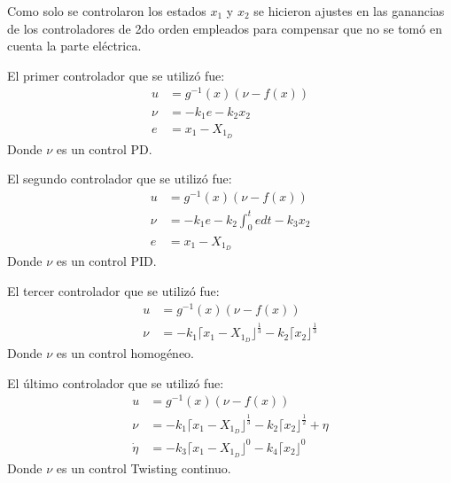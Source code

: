 \documentclass[onecolumn,10pt]{article}
\begin{document}
Como solo se controlaron los estados $x_1$ y $x_2$ se hicieron ajustes en las ganancias de los controladores de 2do orden empleados para compensar que no se tom\'o en cuenta la parte el\'ectrica.

El primer controlador que se utiliz\'o fue:
\begin{equation*}
\begin{split}
 u&=g^{-1}(x)(\nu-f(x))\\
 \nu&=-k_1e-k_2x_2 \\
e&=x_1-X_{1_{D}} 
\end{split}
\end{equation*}
Donde $\nu$ es un control PD.

El segundo controlador que se utiliz\'o fue:
\begin{equation*}
\begin{split}
 u&=g^{-1}(x)(\nu-f(x))\\
 \nu&=-k_1e-k_2\int_{0}^{t}edt-k_3x_2 \\
e&=x_1-X_{1_{D}} 
\end{split}
\end{equation*}
Donde $\nu$ es un control PID.

El tercer controlador que se utiliz\'o fue:
\begin{equation*}
\begin{split}
 u&=g^{-1}(x)(\nu-f(x))\\
 \nu&=-k_1\lceil x_1-X_{1_{D}} \rfloor ^{\frac{1}{3}}-k_2\lceil x_2 \rfloor ^{\frac{1}{3}}
\end{split}
\end{equation*}
Donde $\nu$ es un control homog\'eneo.


El \'ultimo controlador que se utiliz\'o fue:
\begin{equation*}
\begin{split}
 u&=g^{-1}(x)(\nu-f(x))\\
 \nu&=-k_1\lceil x_1-X_{1_{D}} \rfloor ^{\frac{1}{3}}-k_2\lceil x_2 \rfloor ^{\frac{1}{2}}+\eta \\
\dot{\eta}&=-k_3\lceil x_1-X_{1_{D}} \rfloor ^{0}-k_4\lceil x_2 \rfloor ^{0} 
\end{split}
\end{equation*}
Donde $\nu$ es un control Twisting continuo.
\end{document}
